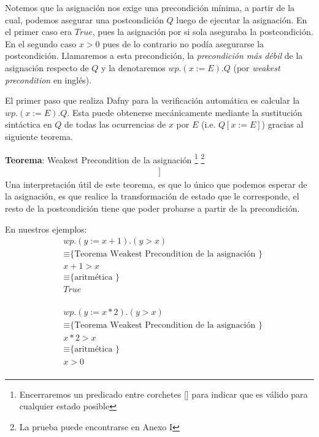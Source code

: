 \documentclass[12pt, a4paper, openany, fleqn]{book}
\begin{document}
    Notemos que la asignación nos exige una precondición mínima, a partir de la cual, podemos asegurar una postcondición $Q$ luego de ejecutar la asignación. En el primer caso era $True$, pues la asignación por si sola aseguraba la postcondición. En el segundo caso $x > 0$ pues de lo contrario no podía asegurarse la postcondición.
    Llamaremos a esta precondición, la \textit{precondición más débil} de la asignación respecto de $Q$ y la denotaremos $wp.(x := E).Q$ (por \textit{weakest precondition} en inglés).

    El primer paso que realiza Dafny para la verificación automática es calcular la $wp.(x := E).Q$.
    Esta puede obtenerse mecánicamente mediante la sustitución sintáctica en $Q$ de todas las ocurrencias de $x$ por $E$ (i.e. $Q[x := E]$) gracias al siguiente teorema.

    \textbf{Teorema}: Weakest Precondition de la asignación
    \footnote{Encerraremos un predicado entre corchetes [] para indicar que es válido para cualquier estado posible}
    \footnote{La prueba puede encontrarse en Anexo I}
    \begin{align*}
        [ wp.(x:=E).Q \equiv Q[x:=E] ]
    \end{align*}
    Una interpretación útil de este teorema, es que lo único que podemos esperar de la asignación, es que realice la transformación de estado que le corresponde, el resto de la postcondición tiene que poder probarse a partir de la precondición.

    En nuestros ejemplos:
    \begin{align*}
        & wp.(y := x + 1).( y > x )\\
        & \equiv \text{\{ Teorema Weakest Precondition de la asignación \}}\\
        & x + 1 > x\\
        & \equiv \text{\{ aritmética \}}\\
        & True\\
    \end{align*}

    \begin{align*}
        & wp.(y := x * 2).( y > x )\\
        & \equiv \text{\{ Teorema Weakest Precondition de la asignación \}}\\
        & x * 2 > x\\
        & \equiv \text{\{ aritmética \}}\\
        & x > 0\\
    \end{align*}
\end{document}
